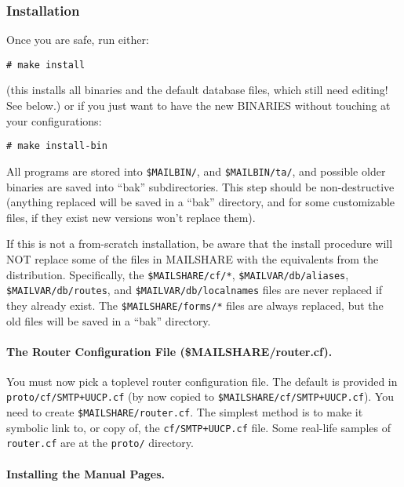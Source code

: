 \subsubsection{Installation}

Once you are safe, run either:
\begin{verbatim}
# make install
\end{verbatim}

(this installs all binaries and the default database files, which
still need editing! See below.)
or if you just want to have the new BINARIES without touching
at your configurations:
\begin{verbatim}
# make install-bin
\end{verbatim}

All programs are stored into  {\tt \$MAILBIN/}, and {\tt \$MAILBIN/ta/}, and
possible older binaries are saved into ``bak'' subdirectories.
This step should be non-destructive (anything replaced will be
saved in a ``bak'' directory, and for some customizable files, if
they exist new versions won't replace them).

If this is not a from-scratch installation, be aware that the
install procedure will NOT replace some of the files in MAILSHARE
with the equivalents from the distribution.  Specifically, the
{\tt \$MAILSHARE/cf/*}, {\tt \$MAILVAR/db/aliases}, {\tt \$MAILVAR/db/routes}, and
{\tt \$MAILVAR/db/localnames} files are never replaced if they already
exist.  The {\tt \$MAILSHARE/forms/*} files are always replaced, but the
old files will be saved in a ``bak'' directory.




\paragraph{The Router Configuration File (\$MAILSHARE/router.cf).}



You must now pick a toplevel router configuration file.  The
default is provided in {\tt proto/cf/SMTP+UUCP.cf} (by now copied to
{\tt \$MAILSHARE/cf/SMTP+UUCP.cf}). You need to create {\tt \$MAILSHARE/router.cf}.
The simplest method is to make it symbolic link to, or copy of,
the {\tt cf/SMTP+UUCP.cf} file.
Some real-life samples of {\tt router.cf} are at the {\tt proto/} directory.




\paragraph{Installing the Manual Pages.}



